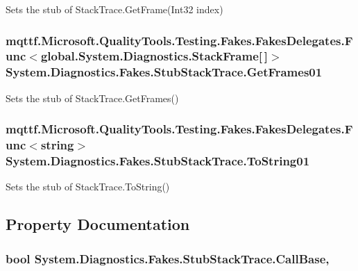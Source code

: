 Sets the stub of Stack\-Trace.\-Get\-Frame(\-Int32 index)

\hypertarget{class_system_1_1_diagnostics_1_1_fakes_1_1_stub_stack_trace_acfdf53d03647da1389e6c50ffa6632ec}{
\subsubsection[{Get\-Frames01}]{\setlength{\rightskip}{0pt plus 5cm}mqttf.\-Microsoft.\-Quality\-Tools.\-Testing.\-Fakes.\-Fakes\-Delegates.\-Func$<$global.\-System.\-Diagnostics.\-Stack\-Frame\mbox{[}$\,$\mbox{]}$>$ System.\-Diagnostics.\-Fakes.\-Stub\-Stack\-Trace.\-Get\-Frames01}}\label{class_system_1_1_diagnostics_1_1_fakes_1_1_stub_stack_trace_acfdf53d03647da1389e6c50ffa6632ec}


Sets the stub of Stack\-Trace.\-Get\-Frames()

\hypertarget{class_system_1_1_diagnostics_1_1_fakes_1_1_stub_stack_trace_aa6aefdaffdad64ab364011be5f9f88a7}{
\subsubsection[{To\-String01}]{\setlength{\rightskip}{0pt plus 5cm}mqttf.\-Microsoft.\-Quality\-Tools.\-Testing.\-Fakes.\-Fakes\-Delegates.\-Func$<$string$>$ System.\-Diagnostics.\-Fakes.\-Stub\-Stack\-Trace.\-To\-String01}}\label{class_system_1_1_diagnostics_1_1_fakes_1_1_stub_stack_trace_aa6aefdaffdad64ab364011be5f9f88a7}


Sets the stub of Stack\-Trace.\-To\-String()



\subsection{Property Documentation}
\hypertarget{class_system_1_1_diagnostics_1_1_fakes_1_1_stub_stack_trace_a204531c161f0acd80b86afa9019bcce6}{
\subsubsection[{Call\-Base}]{\setlength{\rightskip}{0pt plus 5cm}bool System.\-Diagnostics.\-Fakes.\-Stub\-Stack\-Trace.\-Call\-Base\hspace{0.3cm}{\ttfamily [get]}, {\ttfamily [set]}}}\label{class_system_1_1_diagnostics_1_1_fakes_1_1_stub_stack_trace_a204531c161f0acd80b86afa9019bcce6}


